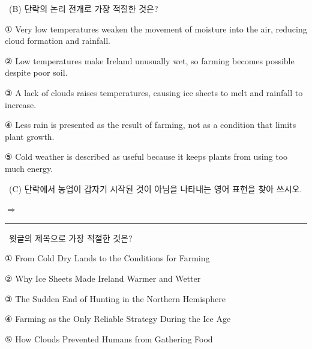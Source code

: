 \documentclass[11pt,a4paper]{article}
\newcommand{\qno}[1]{\par\vspace{8pt}\noindent{\sffamily\bfseries #1.}\ }
\newcommand{\instr}[1]{{\sffamily #1}\par\vspace{3pt}}
\begin{document}
\bigskip

\qno{2}\instr{(B) 단락의 논리 전개로 가장 적절한 것은?}
\begin{choices}
\item ① Very low temperatures weaken the movement of moisture into the air, reducing cloud formation and rainfall.
\item ② Low temperatures make Ireland unusually wet, so farming becomes possible despite poor soil.
\item ③ A lack of clouds raises temperatures, causing ice sheets to melt and rainfall to increase.
\item ④ Less rain is presented as the result of farming, not as a condition that limits plant growth.
\item ⑤ Cold weather is described as useful because it keeps plants from using too much energy.
\end{choices}

\bigskip

\qno{3}\instr{[서술형] (C) 단락에서 농업이 갑자기 시작된 것이 아님을 나타내는 영어 표현을 찾아 쓰시오.}

\vspace{6pt}
\noindent $\Rightarrow$ \rule{10cm}{0.4pt}

\qno{4}\instr{윗글의 제목으로 가장 적절한 것은?}
\begin{choices}
\item ① From Cold Dry Lands to the Conditions for Farming
\item ② Why Ice Sheets Made Ireland Warmer and Wetter
\item ③ The Sudden End of Hunting in the Northern Hemisphere
\item ④ Farming as the Only Reliable Strategy During the Ice Age
\item ⑤ How Clouds Prevented Humans from Gathering Food
\end{choices}
\end{document}

